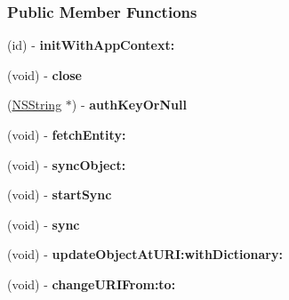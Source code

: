 \subsubsection*{Public Member Functions}
\begin{DoxyCompactItemize}
\item 
\hypertarget{interface_a_t_synchronizer_a1a230c698ce38b033b22310db13120f5}{
(id) -\/ {\bfseries initWithAppContext:}}
\label{interface_a_t_synchronizer_a1a230c698ce38b033b22310db13120f5}

\item 
\hypertarget{interface_a_t_synchronizer_aa091026c249106b0f059a86ae9c5afd8}{
(void) -\/ {\bfseries close}}
\label{interface_a_t_synchronizer_aa091026c249106b0f059a86ae9c5afd8}

\item 
\hypertarget{interface_a_t_synchronizer_affb70ca203d9a187417db200776685c0}{
(\hyperlink{class_n_s_string}{NSString} $\ast$) -\/ {\bfseries authKeyOrNull}}
\label{interface_a_t_synchronizer_affb70ca203d9a187417db200776685c0}

\item 
\hypertarget{interface_a_t_synchronizer_a6b5f15941c11220049e877543e7adb62}{
(void) -\/ {\bfseries fetchEntity:}}
\label{interface_a_t_synchronizer_a6b5f15941c11220049e877543e7adb62}

\item 
\hypertarget{interface_a_t_synchronizer_ae7b25a346a2082dfbd5e54ac9ae6619f}{
(void) -\/ {\bfseries syncObject:}}
\label{interface_a_t_synchronizer_ae7b25a346a2082dfbd5e54ac9ae6619f}

\item 
\hypertarget{interface_a_t_synchronizer_adf5b437093a61f09ee914cc61e30f62d}{
(void) -\/ {\bfseries startSync}}
\label{interface_a_t_synchronizer_adf5b437093a61f09ee914cc61e30f62d}

\item 
\hypertarget{interface_a_t_synchronizer_add32dc8f725e3d33a8b49e9bea0460ba}{
(void) -\/ {\bfseries sync}}
\label{interface_a_t_synchronizer_add32dc8f725e3d33a8b49e9bea0460ba}

\item 
\hypertarget{interface_a_t_synchronizer_a063d9fcbbadfd834fded74a9a90de04e}{
(void) -\/ {\bfseries updateObjectAtURI:withDictionary:}}
\label{interface_a_t_synchronizer_a063d9fcbbadfd834fded74a9a90de04e}

\item 
\hypertarget{interface_a_t_synchronizer_a5975c374e80ef16d1131b8af6a3f1c17}{
(void) -\/ {\bfseries changeURIFrom:to:}}
\label{interface_a_t_synchronizer_a5975c374e80ef16d1131b8af6a3f1c17}


\end{DoxyCompactItemize}
